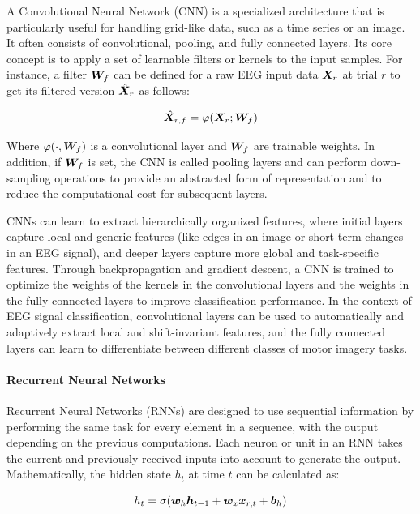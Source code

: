 A Convolutional Neural Network (CNN) is a specialized architecture that is particularly useful for handling grid-like data, such as a time series or an image. It often consists of convolutional, pooling, and fully connected layers. Its core concept is to apply a set of learnable filters or kernels to the input samples. For instance, a filter $\bm {W}_f$ can be defined for a raw EEG input data $\bm {X}_r$ at trial $r$ to get its filtered version $\hat{\bm {X}}_r$ as follows:

\begin{equation}
\hat{\bm {X}}_{r,f} = \varphi(\bm {X}_r; \bm {W}_f)  
\end{equation}

Where $\varphi(\cdot, \bm {W}_f)$ is a convolutional layer and $\bm {W}_f$ are trainable weights. In addition, if $\bm {W}_f$ is set, the CNN is called pooling layers and can perform down-sampling operations to provide an abstracted form of representation and to reduce the computational cost for subsequent layers. 

CNNs can learn to extract hierarchically organized features, where initial layers capture local and generic features (like edges in an image or short-term changes in an EEG signal), and deeper layers capture more global and task-specific features. Through backpropagation and gradient descent, a CNN is trained to optimize the weights of the kernels in the convolutional layers and the weights in the fully connected layers to improve classification performance. In the context of EEG signal classification, convolutional layers can be used to automatically and adaptively extract local and shift-invariant features, and the fully connected layers can learn to differentiate between different classes of motor imagery tasks.

\paragraph{Recurrent Neural Networks}

Recurrent Neural Networks (RNNs) are designed to use sequential information by performing the same task for every element in a sequence, with the output depending on the previous computations. Each neuron or unit in an RNN takes the current and previously received inputs into account to generate the output. Mathematically, the hidden state $h_t$ at time $t$ can be calculated as:

\begin{equation}
h_t = \sigma(\bm {w}_{h} \bm {h}_{t-1} + \bm {w}_x \bm {x}_{r,t} + \bm {b}_h)
\end{equation}

